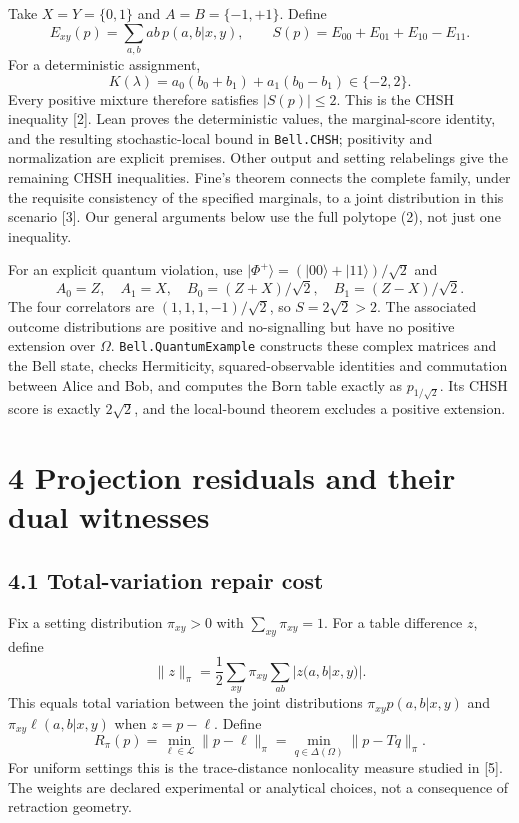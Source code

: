 \documentclass[
]{article}
\begin{document}
Take \(X=Y=\{0,1\}\) and \(A=B=\{-1,+1\}\). Define
\[
E_{xy}(p)=\sum_{a,b}ab\,p(a,b|x,y),\qquad
S(p)=E_{00}+E_{01}+E_{10}-E_{11}.
\]
For a deterministic assignment,
\[
K(\lambda)=a_0(b_0+b_1)+a_1(b_0-b_1)\in\{-2,2\}.
\]
Every positive mixture therefore satisfies \(|S(p)|\le2\). This is the CHSH inequality {[}2{]}. Lean proves the deterministic values, the marginal-score identity, and the resulting stochastic-local bound in \texttt{Bell.CHSH}; positivity and normalization are explicit premises. Other output and setting relabelings give the remaining CHSH inequalities. Fine's theorem connects the complete family, under the requisite consistency of the specified marginals, to a joint distribution in this scenario {[}3{]}. Our general arguments below use the full polytope (2), not just one inequality.

For an explicit quantum violation, use \(|\Phi^+\rangle=(|00\rangle+|11\rangle)/\sqrt2\) and
\[
A_0=Z,\quad A_1=X,\quad
B_0=(Z+X)/\sqrt2,\quad B_1=(Z-X)/\sqrt2.
\]
The four correlators are \((1,1,1,-1)/\sqrt2\), so \(S=2\sqrt2>2\). The associated outcome distributions are positive and no-signalling but have no positive extension over \(\Omega\). \texttt{Bell.QuantumExample} constructs these complex matrices and the Bell state, checks Hermiticity, squared-observable identities and commutation between Alice and Bob, and computes the Born table exactly as \(p_{1/\sqrt2}\). Its CHSH score is exactly \(2\sqrt2\), and the local-bound theorem excludes a positive extension.

\section{4 Projection residuals and their dual witnesses}\label{projection-residuals-and-their-dual-witnesses}

\subsection{4.1 Total-variation repair cost}\label{total-variation-repair-cost}

Fix a setting distribution \(\pi_{xy}>0\) with \(\sum_{xy}\pi_{xy}=1\). For a table difference \(z\), define
\[
\|z\|_\pi=\frac12\sum_{xy}\pi_{xy}\sum_{ab}|z(a,b|x,y)|.
\]
This equals total variation between the joint distributions \(\pi_{xy}p(a,b|x,y)\) and \(\pi_{xy}\ell(a,b|x,y)\) when \(z=p-\ell\). Define
\[
R_\pi(p)=\min_{\ell\in\mathcal L}\|p-\ell\|_\pi
=\min_{q\in\Delta(\Omega)}\|p-Tq\|_\pi.
\tag{3}
\]
For uniform settings this is the trace-distance nonlocality measure studied in {[}5{]}. The weights are declared experimental or analytical choices, not a consequence of retraction geometry.
\end{document}
